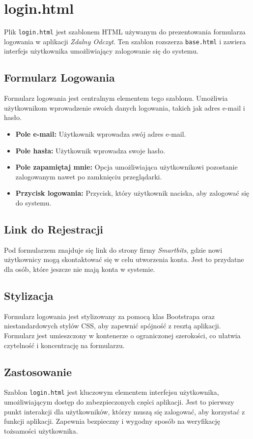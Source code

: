 \documentclass[12pt,a4paper]{report}
\begin{document}
\section{login.html}
\label{sec:login}
Plik \texttt{login.html} jest szablonem HTML używanym do prezentowania formularza logowania w aplikacji \textit{Zdalny Odczyt}. Ten szablon rozszerza \texttt{base.html} i zawiera interfejs użytkownika umożliwiający zalogowanie się do systemu.

\subsection{Formularz Logowania}
Formularz logowania jest centralnym elementem tego szablonu. Umożliwia użytkownikom wprowadzenie swoich danych logowania, takich jak adres e-mail i hasło.

\begin{itemize}
\item \textbf{Pole e-mail:} Użytkownik wprowadza swój adres e-mail.
\item \textbf{Pole hasła:} Użytkownik wprowadza swoje hasło.
\item \textbf{Pole zapamiętaj mnie:} Opcja umożliwiająca użytkownikowi pozostanie zalogowanym nawet po zamknięciu przeglądarki.
\item \textbf{Przycisk logowania:} Przycisk, który użytkownik naciska, aby zalogować się do systemu.
\end{itemize}

\subsection{Link do Rejestracji}
Pod formularzem znajduje się link do strony firmy \textit{Smartbits}, gdzie nowi użytkownicy mogą skontaktować się w celu utworzenia konta. Jest to przydatne dla osób, które jeszcze nie mają konta w systemie.

\subsection{Stylizacja}
Formularz logowania jest stylizowany za pomocą klas Bootstrapa oraz niestandardowych stylów CSS, aby zapewnić spójność z resztą aplikacji. Formularz jest umieszczony w kontenerze o ograniczonej szerokości, co ułatwia czytelność i koncentrację na formularzu.

\subsection{Zastosowanie}
Szablon \texttt{login.html} jest kluczowym elementem interfejsu użytkownika, umożliwiającym dostęp do zabezpieczonych części aplikacji. Jest to pierwszy punkt interakcji dla użytkowników, którzy muszą się zalogować, aby korzystać z funkcji aplikacji. Zapewnia bezpieczny i wygodny sposób na weryfikację tożsamości użytkownika.
\end{document}
